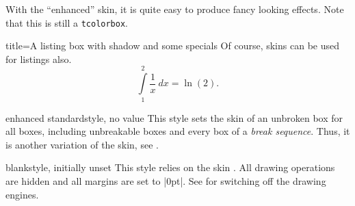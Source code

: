 \begin{dispExample}
\end{dispExample}

\clearpage

\begin{dispExample}

\begin{tcolorbox}[title=Nice box in rainbow colors]
  With the ``enhanced'' skin, it is quite easy to produce fancy looking effects.
  \tcblower
  Note that this is still a \texttt{tcolorbox}.
\end{tcolorbox}
\end{dispExample}


\begin{dispExample}

\begin{tcblisting}{title=A listing box with shadow and some specials}
Of course, skins can be used for listings also.
\begin{equation}
  \int\limits_1^2 \frac{1}{x}~dx = \ln(2).
\end{equation}
\end{tcblisting}
\end{dispExample}


\clearpage


\begin{docTcbKey}{enhanced standard}{}{style, no value}
  This style sets the  skin of an unbroken box
  for all boxes, including unbreakable
  boxes and every box of a \emph{break sequence}. Thus, it is another variation
  of the  skin, see .
\end{docTcbKey}


\begin{docTcbKey}{blank}{}{style, initially unset}
  This style relies on the skin . All drawing operations
  are hidden and all margins are set to |0pt|. See 
  for switching off the drawing engines.
\begin{dispExample}
\begin{tcolorbox}[blank,watermark text=A blank box]
\lipsum[1]
\end{tcolorbox}
\end{dispExample}
\end{docTcbKey}

